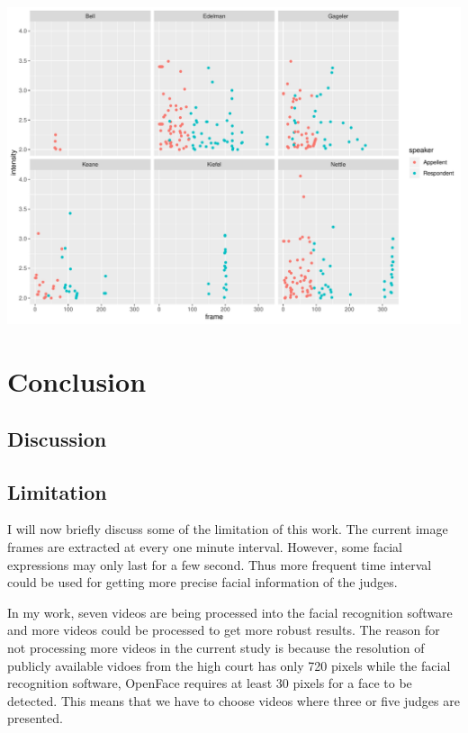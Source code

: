 \documentclass{monashthesis}
\begin{document}
\begin{center}\includegraphics[width=1\linewidth]{figures/unnamed-chunk-20-1} \end{center}

\hypertarget{conclusion}{%
\chapter{Conclusion}\label{conclusion}}

\hypertarget{discussion}{%
\section{Discussion}\label{discussion}}

\hypertarget{limitation}{%
\section{Limitation}\label{limitation}}

I will now briefly discuss some of the limitation of this work. The current image frames are extracted at every one minute interval. However, some facial expressions may only last for a few second. Thus more frequent time interval could be used for getting more precise facial information of the judges.

In my work, seven videos are being processed into the facial recognition software and more videos could be processed to get more robust results. The reason for not processing more videos in the current study is because the resolution of publicly available vidoes from the high court has only 720 pixels while the facial recognition software, OpenFace requires at least 30 pixels for a face to be detected. This means that we have to choose videos where three or five judges are presented.
\end{document}
